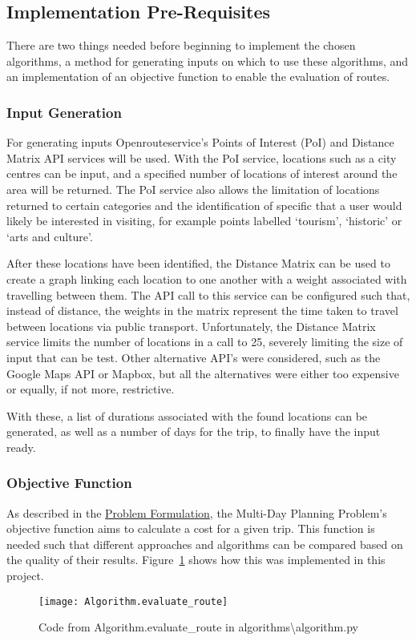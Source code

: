 \subsection{Implementation Pre-Requisites}\label{subsec:implementation-pre-requisites}
There are two things needed before beginning to implement the chosen algorithms, a method for generating inputs on which
to use these algorithms, and an implementation of an objective function to enable the evaluation of routes.

\subsubsection{Input Generation}\label{subsubsec:input-generation}
For generating inputs Openrouteservice's Points of Interest (PoI) and Distance Matrix API services will be used.
With the PoI service, locations such as a city centres can be input, and a specified number of locations of interest
around the area will be returned.
The PoI service also allows the limitation of locations returned to certain categories and the identification of
specific that a user would likely be interested in visiting, for example points labelled `tourism', `historic' or
`arts and culture'.

After these locations have been identified, the Distance Matrix can be used to create a graph linking each location to
one another with a weight associated with travelling between them.
The API call to this service can be configured such that, instead of distance, the weights in the matrix represent
the time taken to travel between locations via public transport.
Unfortunately, the Distance Matrix service limits the number of locations in a call to 25, severely limiting the
size of input that can be test.
Other alternative API's were considered, such as the Google Maps API or Mapbox, but all the alternatives were either too
expensive or equally, if not more, restrictive.

With these, a list of durations associated with the found locations can be generated, as well as a number of days for
the trip, to finally have the input ready.

\subsubsection{Objective Function}\label{subsubsec:algorithms-objective-function}
As described in the \hyperref[sec:problem-formulation]{Problem Formulation}, the Multi-Day Planning Problem's objective
function aims to calculate a cost for a given trip.
This function is needed such that different approaches and algorithms can be compared based on the quality of their
results.
Figure~\ref{fig:Algorithm.evaluate_route} shows how this was implemented in this project.
\begin{figure}[H]
    \centering
    \texttt{[image: Algorithm.evaluate\_route]}
    \caption{Code from Algorithm.evaluate\_route in algorithms\textbackslash algorithm.py}
    \label{fig:Algorithm.evaluate_route}
\end{figure}

